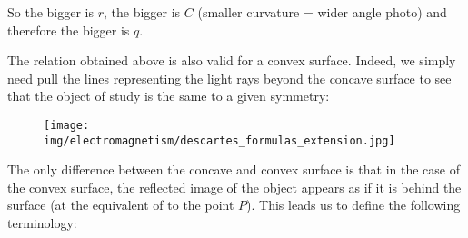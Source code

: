 	So the bigger is $r$, the bigger is $C$ (smaller curvature = wider angle photo) and therefore the bigger is $q$.

	The relation obtained above is also valid for a convex surface. Indeed, we simply need pull the lines representing the light rays beyond the concave surface to see that the object of study is the same to a given symmetry:
	\begin{figure}[H]
		\centering
		\texttt{[image: img/electromagnetism/descartes\_formulas\_extension.jpg]}
	\end{figure}
	The only difference between the concave and convex surface is that in the case of the convex surface, the reflected image of the object appears as if it is behind the surface (at the equivalent of to the point $P$). This leads us to define the following terminology:
	
